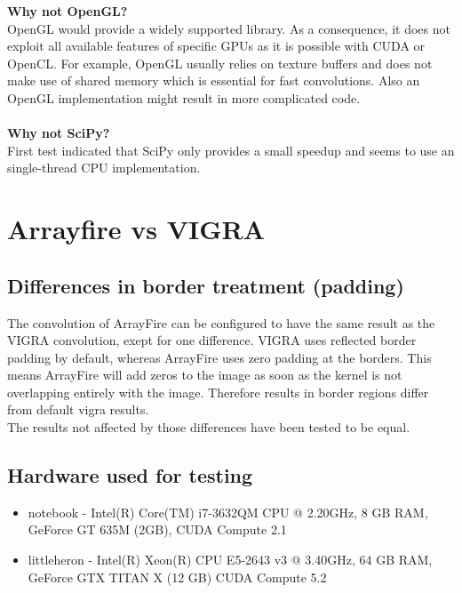 \documentclass[12pt,a4paper]{article}
\begin{document}
\textbf{Why not OpenGL?} \\
OpenGL would provide a widely supported library.
As a consequence, it does not exploit all available features of specific GPUs as it is possible with CUDA or OpenCL. For example, OpenGL usually relies on texture buffers and does not make use of shared memory which is essential for fast convolutions.
Also an OpenGL implementation might result in more complicated code. \\ \\
\textbf{Why not SciPy?} \\
First test indicated that SciPy only provides a small speedup and seems to use an single-thread CPU implementation.

\section{Arrayfire vs VIGRA}

\subsection{Differences in border treatment (padding)}
The convolution of ArrayFire can be configured to have the same result as the VIGRA convolution, exept for one difference.
VIGRA uses reflected border padding by default, whereas ArrayFire uses zero padding at the borders.
This means ArrayFire will add zeros to the image as soon as the kernel is not overlapping entirely with the image.
Therefore results in border regions differ from default vigra results.\\
The results not affected by those differences have been tested to be equal.


\subsection{Hardware used for testing}
\begin{itemize}
  \item notebook - Intel(R) Core(TM) i7-3632QM CPU @ 2.20GHz, 8 GB RAM, GeForce GT 635M (2GB), CUDA Compute 2.1
  \item littleheron - Intel(R) Xeon(R) CPU E5-2643 v3 @ 3.40GHz, 64 GB RAM, GeForce GTX TITAN X (12 GB) CUDA Compute 5.2
\end{itemize}
\end{document}
